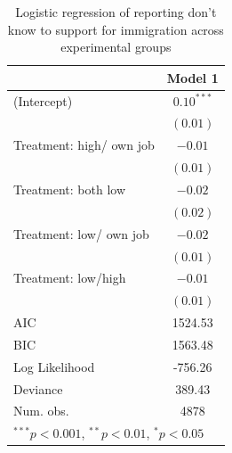 \documentclass{article}\usepackage[]{graphicx}\usepackage[]{color}
\begin{document}
\begin{appendix}
\begin{table}
\begin{center}
\begin{tabular}{l c }
\hline
 & Model 1 \\
\hline
(Intercept)              & $0.10^{***}$ \\
                         & $(0.01)$     \\
Treatment: high/ own job & $-0.01$      \\
                         & $(0.01)$     \\
Treatment: both low      & $-0.02$      \\
                         & $(0.02)$     \\
Treatment: low/ own job  & $-0.02$      \\
                         & $(0.01)$     \\
Treatment: low/high      & $-0.01$      \\
                         & $(0.01)$     \\
\hline
AIC                      & 1524.53      \\
BIC                      & 1563.48      \\
Log Likelihood           & -756.26      \\
Deviance                 & 389.43       \\
Num. obs.                & 4878         \\
\hline
\multicolumn{2}{l}{\scriptsize{$^{***}p<0.001$, $^{**}p<0.01$, $^*p<0.05$}}
\end{tabular}
\caption{Logistic regression of reporting don't know to support for immigration across experimental groups}
\label{table:dk.pred}
\end{center}
\end{table}


\end{appendix}
\end{document}
